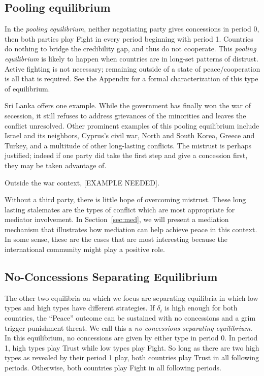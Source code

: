 \documentclass[12pt, letterpaper]{article}
\begin{document}
\subsection{Pooling equilibrium}
In the \emph{pooling equilibrium}, neither negotiating party gives concessions in period 0, then both parties play Fight in every period beginning with period 1. Countries do nothing to bridge the credibility gap, and thus do not cooperate. This \emph{pooling equilibrium} is likely to happen when countries are in long-set patterns of distrust. Active fighting is not necessary; remaining outside of a state of peace/cooperation is all that is required.  See the Appendix for a formal characterization of this type of equilibrium. 


Sri Lanka offers one example. While the government has finally won the war of secession, it still refuses to address grievances of the minorities and leaves the conflict unresolved. Other prominent examples of this pooling equilibrium include Israel and its neighbors, Cyprus's civil war, North and South Korea, Greece and Turkey, and a multitude of other long-lasting conflicts. The mistrust is perhaps justified; indeed if one party did take the first step and give a concession first, they may be taken advantage of. 

Outside the war context, [EXAMPLE NEEDED].

Without a third party, there is little hope of overcoming mistrust. These long lasting stalemates are the types of conflict which are most appropriate for mediator involvement. In Section~\ref{sec:med}, we will present a mediation mechanism that illustrates how mediation can help achieve peace in this context. In some sense, these are the cases that are most interesting because the international community might play a positive role. 

\subsection{No-Concessions Separating Equilibrium}
\label{sec:ncse}
The other two equilibria on which we focus are separating equilibria in which low types and high types have different strategies. If $\delta_i$ is high enough for both countries, the ``Peace'' outcome can be sustained with no concessions and a grim trigger punishment threat. We call this a \emph{no-concessions separating equilibrium}. In this equilibrium, no concessions are given by either type in period 0. In period 1, high types play Trust while low types play Fight. So long as there are two high types as revealed by their period 1 play, both countries play Trust in all following periods. Otherwise, both countries play Fight in all following periods. 
\end{document}
